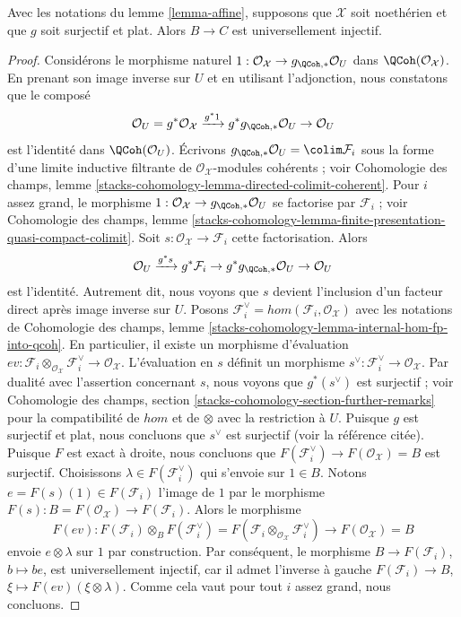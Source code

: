 \begin{lemma}
\label{lemma-universally-injective}
Avec les notations du lemme \ref{lemma-affine}, supposons que $\mathcal{X}$ soit
noethérien et que $g$ soit surjectif et plat.
Alors $B \to C$ est universellement injectif.
\end{lemma}

\begin{proof}
Considérons le morphisme naturel
$1 : \mathcal{O}_\mathcal{X} \to g_{\QCoh, *}\mathcal{O}_U$
dans $\QCoh(\mathcal{O}_\mathcal{X})$. En prenant son image inverse sur $U$ et
en utilisant l'adjonction, nous constatons que le composé
$$
\mathcal{O}_U =
g^*\mathcal{O}_\mathcal{X} \xrightarrow{g^*1}
g^*g_{\QCoh, *}\mathcal{O}_U \to \mathcal{O}_U
$$
est l'identité dans $\QCoh(\mathcal{O}_U)$.
Écrivons $g_{\QCoh, *}\mathcal{O}_U = \colim \mathcal{F}_i$
sous la forme d'une limite inductive filtrante de $\mathcal{O}_\mathcal{X}$-modules cohérents ; voir
Cohomologie des champs, lemme
\ref{stacks-cohomology-lemma-directed-colimit-coherent}.
Pour $i$ assez grand, le morphisme
$1 : \mathcal{O}_\mathcal{X} \to g_{\QCoh, *}\mathcal{O}_U$
se factorise par $\mathcal{F}_i$ ; voir
Cohomologie des champs, lemme
\ref{stacks-cohomology-lemma-finite-presentation-quasi-compact-colimit}.
Soit $s : \mathcal{O}_\mathcal{X} \to \mathcal{F}_i$ cette
factorisation. Alors
$$
\mathcal{O}_U \xrightarrow{g^*s} g^*\mathcal{F}_i \to
g^*g_{\QCoh, *}\mathcal{O}_U \to \mathcal{O}_U
$$
est l'identité. Autrement dit, nous voyons que $s$ devient
l'inclusion d'un facteur direct après image inverse sur $U$. Posons
$\mathcal{F}_i^\vee = hom(\mathcal{F}_i, \mathcal{O}_\mathcal{X})$
avec les notations de
Cohomologie des champs, lemme
\ref{stacks-cohomology-lemma-internal-hom-fp-into-qcoh}.
En particulier, il existe un morphisme d'évaluation
$ev : \mathcal{F}_i \otimes_{\mathcal{O}_\mathcal{X}} \mathcal{F}_i^\vee
\to \mathcal{O}_\mathcal{X}$.
L'évaluation en $s$ définit un morphisme
$s^\vee : \mathcal{F}_i^\vee \to \mathcal{O}_\mathcal{X}$.
Par dualité avec l'assertion concernant $s$, nous voyons que $g^*(s^\vee)$ est surjectif ;
voir Cohomologie des champs, section
\ref{stacks-cohomology-section-further-remarks}
pour la compatibilité de $hom$ et de $\otimes$ avec la restriction à $U$.
Puisque $g$ est surjectif et plat, nous concluons que $s^\vee$ est surjectif
(voir la référence citée). Puisque $F$ est exact à droite, nous concluons que
$F(\mathcal{F}_i^\vee) \to F(\mathcal{O}_\mathcal{X}) = B$ est surjectif.
Choisissons $\lambda \in F(\mathcal{F}_i^\vee)$
qui s'envoie sur $1 \in B$. Notons $e = F(s)(1) \in F(\mathcal{F}_i)$
l'image de $1$ par le morphisme
$F(s) : B = F(\mathcal{O}_\mathcal{X}) \to F(\mathcal{F}_i)$.
Alors le morphisme
$$
F(ev) :
F(\mathcal{F}_i) \otimes_B F(\mathcal{F}_i^\vee) =
F(\mathcal{F}_i \otimes_{\mathcal{O}_\mathcal{X}} \mathcal{F}_i^\vee)
\longrightarrow
F(\mathcal{O}_\mathcal{X}) = B
$$
envoie $e \otimes \lambda$ sur $1$ par construction. Par conséquent, le
morphisme $B \to F(\mathcal{F}_i)$, $b \mapsto be$,
est universellement injectif, car il admet l'inverse à gauche
$F(\mathcal{F}_i) \to B$, $\xi \mapsto F(ev)(\xi \otimes \lambda)$.
Comme cela vaut pour tout $i$ assez grand, nous concluons.
\end{proof}

